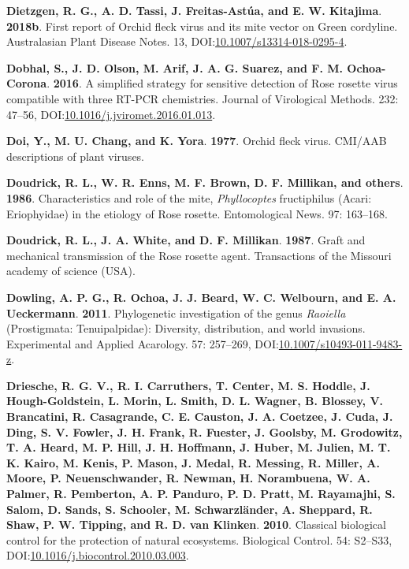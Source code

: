 \documentclass[12pt,final,CPage]{ufthesis}
\newlength{\cslhangindent}
\newenvironment{CSLReferences}[2] %
{%
	\setlength{\parindent}{0pt}
	\ifodd #1 \everypar{\setlength{\hangindent}{\cslhangindent}}\ignorespaces\fi
	\ifnum #2 > 0
	\setlength{\parskip}{#2\baselineskip}
	\fi
}%
{}
\begin{document}
{\begin{CSLReferences}{1}{0}
  \leavevmode{}%
  \textbf{Dietzgen, R. G., A. D. Tassi, J. Freitas-Astúa, and E. W. Kitajima}. \textbf{2018b}. First report of {Orchid fleck virus} and its mite vector on {Green cordyline}. Australasian Plant Disease Notes. 13, DOI:\href{https://doi.org/10.1007/s13314-018-0295-4}{10.1007/s13314-018-0295-4}.

  \leavevmode{}%
  \textbf{Dobhal, S., J. D. Olson, M. Arif, J. A. G. Suarez, and F. M. Ochoa-Corona}. \textbf{2016}. A simplified strategy for sensitive detection of {Rose rosette virus} compatible with three {RT}-{PCR} chemistries. Journal of Virological Methods. 232: 47--56, DOI:\href{https://doi.org/10.1016/j.jviromet.2016.01.013}{10.1016/j.jviromet.2016.01.013}.

  \leavevmode{}%
  \textbf{Doi, Y., M. U. Chang, and K. Yora}. \textbf{1977}. Orchid fleck virus. {CMI/AAB} descriptions of plant viruses.

  \leavevmode{}%
  \textbf{Doudrick, R. L., W. R. Enns, M. F. Brown, D. F. Millikan, and others}. \textbf{1986}. Characteristics and role of the mite, {\emph{Phyllocoptes} fructiphilus} ({Acari}: {Eriophyidae}) in the etiology of {Rose rosette}. Entomological News. 97: 163--168.

  \leavevmode{}%
  \textbf{Doudrick, R. L., J. A. White, and D. F. Millikan}. \textbf{1987}. Graft and mechanical transmission of the {Rose rosette} agent. Transactions of the {Missouri} academy of science {(USA)}.

  \leavevmode{}%
  \textbf{Dowling, A. P. G., R. Ochoa, J. J. Beard, W. C. Welbourn, and E. A. Ueckermann}. \textbf{2011}. Phylogenetic investigation of the genus {\emph{Raoiella}} ({Prostigmata}: {Tenuipalpidae}): Diversity, distribution, and world invasions. Experimental and Applied Acarology. 57: 257--269, DOI:\href{https://doi.org/10.1007/s10493-011-9483-z}{10.1007/s10493-011-9483-z}.

  \leavevmode{}%
  \textbf{Driesche, R. G. V., R. I. Carruthers, T. Center, M. S. Hoddle, J. Hough-Goldstein, L. Morin, L. Smith, D. L. Wagner, B. Blossey, V. Brancatini, R. Casagrande, C. E. Causton, J. A. Coetzee, J. Cuda, J. Ding, S. V. Fowler, J. H. Frank, R. Fuester, J. Goolsby, M. Grodowitz, T. A. Heard, M. P. Hill, J. H. Hoffmann, J. Huber, M. Julien, M. T. K. Kairo, M. Kenis, P. Mason, J. Medal, R. Messing, R. Miller, A. Moore, P. Neuenschwander, R. Newman, H. Norambuena, W. A. Palmer, R. Pemberton, A. P. Panduro, P. D. Pratt, M. Rayamajhi, S. Salom, D. Sands, S. Schooler, M. Schwarzländer, A. Sheppard, R. Shaw, P. W. Tipping, and R. D. van Klinken}. \textbf{2010}. Classical biological control for the protection of natural ecosystems. Biological Control. 54: S2--S33, DOI:\href{https://doi.org/10.1016/j.biocontrol.2010.03.003}{10.1016/j.biocontrol.2010.03.003}.


\end{CSLReferences}}
\end{document}
